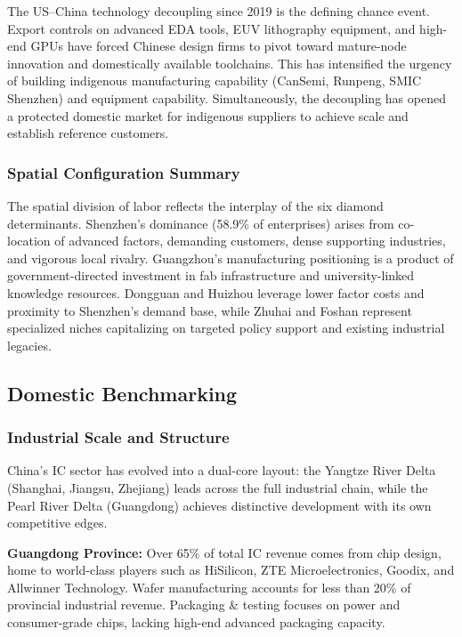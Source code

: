 \documentclass[12pt,a4paper]{article}
\begin{document}
The US--China technology decoupling since 2019 is the defining chance
event. Export controls on advanced EDA tools, EUV lithography equipment,
and high-end GPUs have forced Chinese design firms to pivot toward
mature-node innovation and domestically available toolchains. This has
intensified the urgency of building indigenous manufacturing capability
(CanSemi, Runpeng, SMIC Shenzhen) and equipment capability. Simultaneously,
the decoupling has opened a protected domestic market for indigenous
suppliers to achieve scale and establish reference customers.

\subsubsection{Spatial Configuration Summary}

The spatial division of labor reflects the interplay of the six diamond
determinants. Shenzhen's dominance (58.9\% of enterprises) arises from
co-location of advanced factors, demanding customers, dense supporting
industries, and vigorous local rivalry. Guangzhou's manufacturing
positioning is a product of government-directed investment in fab
infrastructure and university-linked knowledge resources. Dongguan and
Huizhou leverage lower factor costs and proximity to Shenzhen's demand
base, while Zhuhai and Foshan represent specialized niches capitalizing
on targeted policy support and existing industrial legacies.

\subsection{Domestic Benchmarking}
\label{sec:domestic_comparison}

\subsubsection{Industrial Scale and Structure}

China's IC sector has evolved into a dual-core layout: the Yangtze
River Delta (Shanghai, Jiangsu, Zhejiang) leads across the full
industrial chain, while the Pearl River Delta (Guangdong) achieves
distinctive development with its own competitive edges.

\textbf{Guangdong Province:} Over 65\% of total IC revenue comes from
chip design, home to world-class players such as HiSilicon, ZTE
Microelectronics, Goodix, and Allwinner Technology. Wafer manufacturing
accounts for less than 20\% of provincial industrial revenue. Packaging
\& testing focuses on power and consumer-grade chips, lacking high-end
advanced packaging capacity.
\end{document}
